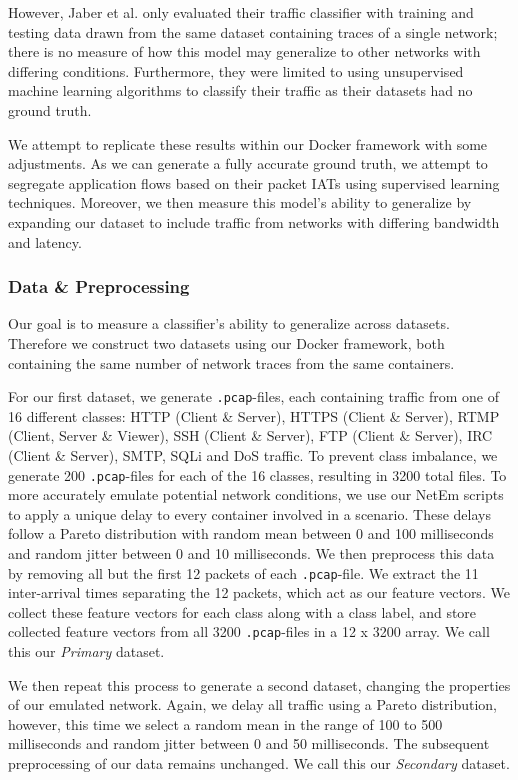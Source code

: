  However, Jaber et al. \cite{jaber2011can} only evaluated their traffic classifier with training and testing data drawn from the same dataset containing traces of a single network; there is no measure of how this model may generalize to other networks with differing conditions. Furthermore, they were limited to using unsupervised machine learning algorithms to classify their traffic as their datasets had no ground truth. 

We attempt to replicate these results within our Docker framework with some adjustments. As we can generate a fully accurate ground truth, we attempt to segregate application flows based on their packet IATs using supervised learning techniques. Moreover, we then measure this model's ability to generalize by expanding our dataset to include traffic from networks with differing bandwidth and latency.

\subsubsection*{Data \& Preprocessing}

Our goal is to measure a classifier's ability to generalize across datasets. Therefore we construct two datasets using our Docker framework, both containing the same number of network traces from the same containers. 

For our first dataset, we generate \texttt{.pcap}-files, each containing traffic from one of 16 different classes: HTTP (Client \& Server), HTTPS (Client \& Server), RTMP (Client, Server \& Viewer), SSH (Client \& Server), FTP (Client \& Server), IRC (Client \& Server), SMTP, SQLi and DoS traffic. To prevent class imbalance, we generate 200 \texttt{.pcap}-files for each of the 16 classes, resulting in 3200 total files. To more accurately emulate potential network conditions, we use our NetEm scripts to apply a unique delay to every container involved in a scenario. These delays follow a Pareto distribution with random mean between 0 and 100 milliseconds and random jitter between 0 and 10 milliseconds. We then preprocess this data by removing all but the first 12 packets of each \texttt{.pcap}-file. We extract the 11 inter-arrival times separating the 12 packets, which act as our feature vectors. We collect these feature vectors for each class along with a class label, and store collected feature vectors from all 3200 \texttt{.pcap}-files in a 12 x 3200 array. We call this our \textit{Primary} dataset.

We then repeat this process to generate a second dataset, changing the properties of our emulated network. Again, we delay all traffic using a Pareto distribution, however, this time we select a random mean in the range of 100 to 500 milliseconds and random jitter between 0 and 50 milliseconds. The subsequent preprocessing of our data remains unchanged. We call this our \textit{Secondary} dataset.

